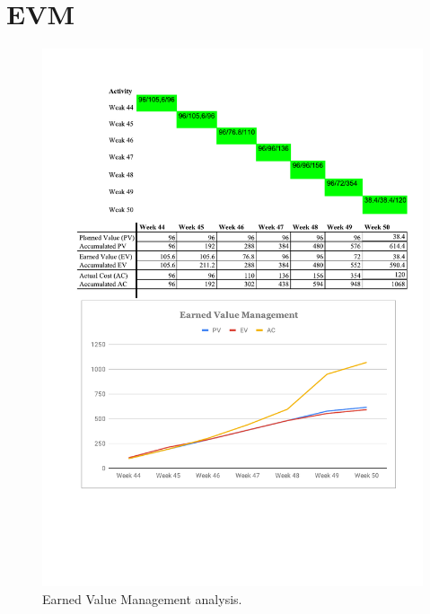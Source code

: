 \documentclass[11pt, titlepage]{article} %
\begin{document}
\section{EVM}
\begin{figure}[h]
     \centering
     \includegraphics[scale=0.8]{evm.pdf}
     \caption{Earned Value Management analysis.}
     \label{fig:evm}
\end{figure}
\end{document}
